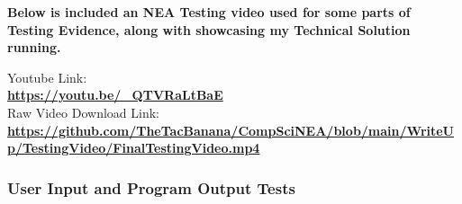 \vspace{1cm}

\begin{center}
    \large
    \textbf{Below is included an NEA Testing video used for some parts of Testing Evidence, along with showcasing my Technical Solution running.}
    
    \vspace{0.2cm}
    
    \Large
    {\large Youtube Link:} \\
    \textbf{\url{https://youtu.be/\_QTVRaLtBaE}} \\
    {\large Raw Video Download Link:} \\
    \textbf{\url{https://github.com/TheTacBanana/CompSciNEA/blob/main/WriteUp/TestingVideo/FinalTestingVideo.mp4}}
\end{center}

\pagebreak

\vspace{1cm}
\subsubsection{User Input and Program Output Tests}
\vspace{0.5cm}

